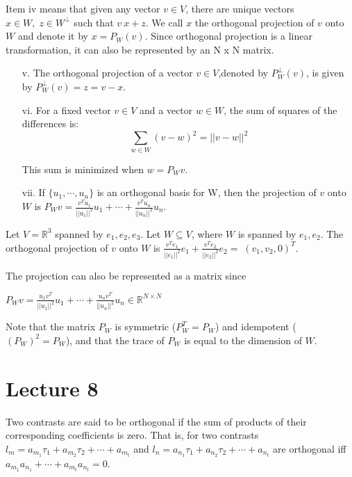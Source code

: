 \documentclass{tufte-book}
\begin{document}
Item iv means that given any vector $v \in V$, there are unique vectors $x \in W, \; z \in W^{\perp}$ such that
$v \ x + z$. We call $x$ the orthogonal projection of $v$ onto $W$ and denote it by $x = P_{W}(v)$. Since orthogonal 
projection is a linear transformation, it can also be represented by an N x N matrix.

\begin{enumerate}
\item[v.] The orthogonal projection of a vector $v \in V$,denoted by $P^{\perp}_{W}(v)$, is given by $P^{\perp}_{W}(v) = z = v - x$.

\item[vi.] For a fixed vector $v \in V$ and a vector $w \in W$, the sum of squares of the differences is: \[\sum_{w \in W} (v - w)^{2} = ||v - w||^{2}\]

This sum is minimized when $w = P_{W}v$.

\item[vii.] If $\{ u_{1}, \cdots , u_{n}\}$ is an orthogonal basis for W, then the projection of $v$ onto $W$ is $P_{W}v = \frac{v^{T}u_{1}}{||u_{1}||^{2}} u_{1} + \cdots + \frac{v^{T}u_{n}}{||u_{n}||^{2}} u_{n}$.

\end{enumerate}

Let $V = \mathbb{R}^{3}$ spanned by $e_{1}, e_{2}, e_{3}$. Let $W \subseteq V$, where $W$ is spanned by $e_{1}, e_{2}$.  The 
orthogonal projection of $v$ onto $W$ is $\frac{v^{T}e_{1}}{||e_{1}||^{2}} e_{1} +  \frac{v^{T}e_{2}}{||e_{2}||^{2}} e_{2} 
= \; (v_{1}, v_{2}, 0)^{T}$.\newline

The projection can also be represented as a matrix since 

\begin{math}
P_{W}v = \frac{u_{1}v^{T}}{||u_{1}||^{2}}u_{1}  + \cdots + \frac{u_{n}v^{T} }{||u_{n}||^{2}}u_{n}  \in \mathbb{R}^{N \times N}
\end{math}

Note that the matrix $P_{W}$ is symmetric ($P^{T}_{W} = P_{W}$) and idempotent ($(P_{W})^{2} = P_{W}$), and that the trace of 
$P_{W}$ is equal to the dimension of $W$.

\section{Lecture 8}

Two contrasts are said to be orthogonal if the sum of products of their corresponding coefficients is zero. That is, for two 
contrasts
$l_{m} = a_{m_{1}}\tau_{1} + a_{m_{2}}\tau_{2} + \cdots + a_{m_{t}}$ and 
$l_{n} = a_{n_{1}}\tau_{1} + a_{n_{2}}\tau_{2} + \cdots + a_{n_{t}}$ are orthogonal iff 
$a_{m_{1}} a_{n_{1}} + \cdots + a_{m_{t}} a_{n_{t}} = 0$.
\end{document}
